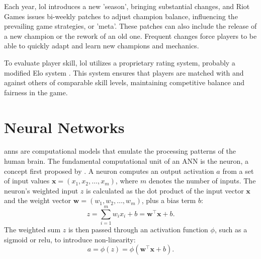 \documentclass[12pt, a4paper, headinclude, twoside, plainheadsepline, open=right, numbers=noenddot, hidelinks, toc=listof, toc=bibliography]{scrreprt}
\begin{document}
Each year, \ac{lol} introduces a new 'season', bringing substantial changes, and Riot Games issues bi-weekly patches to adjust champion balance, influencing the prevailing game strategies, or 'meta'.
These patches can also include the release of a new champion or the rework of an old one.
Frequent changes force players to be able to quickly adapt and learn new champions and mechanics.

To evaluate player skill, \ac{lol} utilizes a proprietary rating system, probably a modified Elo system \cite{janssonNeuralNetworksStandardizing2022}.
This system ensures that players are matched with and against others of comparable skill levels, maintaining competitive balance and fairness in the game.


\section{Neural Networks}
\label{sec:nn}

\Acp{ann} are computational models that emulate the processing patterns of the human brain. The fundamental computational unit of an ANN is the neuron, a concept first proposed by \citeauthor{mccullochLogicalCalculusIdeas1943} \cite{mccullochLogicalCalculusIdeas1943}.
A neuron computes an output activation $a$ from a set of input values $\mathbf{x} = (x_1, x_2, \ldots, x_m)$, where $m$ denotes the number of inputs. 
The neuron's weighted input $z$ is calculated as the dot product of the input vector $\mathbf{x}$ and the weight vector $\mathbf{w} = (w_1, w_2, \ldots, w_m)$, plus a bias term $b$:
\begin{equation}
z = \sum_{i=1}^{m} w_i x_i + b = \mathbf{w}^\top \mathbf{x} + b.
\end{equation}
The weighted sum $z$ is then passed through an activation function $\phi$, such as a sigmoid or \ac{relu}, to introduce non-linearity:
\begin{equation}
a = \phi(z) = \phi(\mathbf{w}^\top \mathbf{x} + b).
\end{equation}
\end{document}
